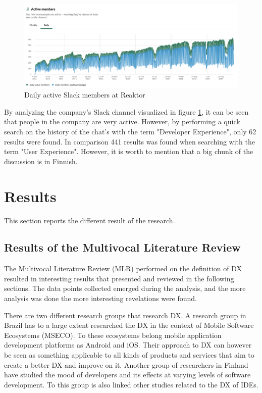 \documentclass[english, 12pt, a4paper, sci, utf8, a-1b, online]{aaltothesis}
\begin{document}
\begin{figure}[ht]
  \captionsetup{width=1\textwidth}
  \caption{Daily active Slack members at Reaktor}
  \begin{center}
    \includegraphics[width=1\textwidth]{daily-active-slack-members.png}
  \end{center}
  \label{figure:slack-members}
\end{figure}

By analyzing the company's Slack channel visualized in figure \ref{figure:slack-members}, it can be seen that people in the company are very active. However, by performing a quick search on the history of the chat's with the term "Developer Experience", only 62 results were found. In comparison 441 results was found when searching with the term "User Experience". However, it is worth to mention that a big chunk of the discussion is in Finnish.

\clearpage
\section{Results}

This section reports the different result of the research.

\subsection{Results of the Multivocal Literature Review} \label{section:result-of-mlr}

The Multivocal Literature Review (MLR) performed on the definition of DX resulted in interesting results that presented and reviewed in the following sections. The data points collected emerged during the analysis, and the more analysis was done the more interesting revelations were found.

There are two different research groups that research DX. A research group in Brazil has to a large extent researched the DX in the context of Mobile Software Ecosystems (MSECO). To these ecosystems belong mobile application development platforms as Android and iOS. Their approach to DX can however be seen as something applicable to all kinds of products and services that aim to create a better DX and improve on it. Another group of researchers in Finland have studied the mood of developers and its effects at varying levels of software development. To this group is also linked other studies related to the DX of IDEs.
\end{document}
